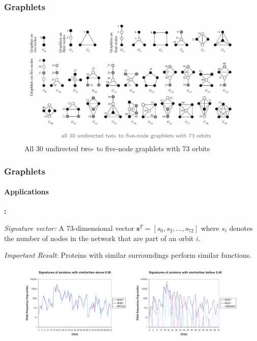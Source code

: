 \documentclass{beamer}
\begin{document}
\begin{frame}
    \frametitle{Graphlets}
    \begin{figure}
        \centering
        \includegraphics[scale=.4]{graphlets.png}
        \caption*{All 30 undirected two- to five-node
        graphlets with 73 orbits \cite{prvzulj2007biological}}
    \end{figure}
\end{frame}
\begin{frame}
    \frametitle{Graphlets}
    \framesubtitle{Applications}
    \textbf{:}

    \textit{Signature vector:} A 73-dimensional vector
    $\mathbf{s}^T
    = [s_0, s_2, ..., s_{72}]$ where $s_i$ denotes the number of nodes in
    the network that are part of an orbit $i$.
    
    \textit{Important Result}: Proteins with similar surroundings perform
    similar functions.
    \begin{figure}[H]
        \centering
        \includegraphics[width=\textwidth]{figures/signature-comparison.png}
        \caption*{\cite{milenkoviae2008uncovering}}
    \end{figure}
\end{frame}
\end{document}
